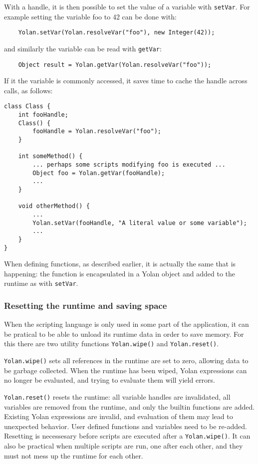 \documentclass[11pt]{report}
\begin{document}
With a handle, it is then possible to set the value of a variable with \verb|setVar|. For example setting the variable foo to 42 can be done with:
\begin{lstlisting}
    Yolan.setVar(Yolan.resolveVar("foo"), new Integer(42));
\end{lstlisting} 
and similarly the variable can be read with \verb|getVar|:
\begin{lstlisting}
    Object result = Yolan.getVar(Yolan.resolveVar("foo"));
\end{lstlisting}

If it the variable is commonly accessed, it saves time to cache the handle across calls, as follows:
\begin{lstlisting}
class Class {
    int fooHandle;
    Class() {
        fooHandle = Yolan.resolveVar("foo");
    }

    int someMethod() {
        ... perhaps some scripts modifying foo is executed ...
        Object foo = Yolan.getVar(fooHandle);
        ...
    }

    void otherMethod() {
        ... 
        Yolan.setVar(fooHandle, "A literal value or some variable");
        ...
    }
}
\end{lstlisting}
When defining functions, as described earlier, it is actually the same that is happening: the function is encapsulated in a Yolan object and added to the runtime as with \verb|setVar|.

\subsubsection{Resetting the runtime and saving space}
When the scripting language is only used in some part of the application, it can be pratical to be able to unload its runtime data in order to save memory. 
For this there are two utility functions \verb|Yolan.wipe()| and \verb|Yolan.reset()|.

\verb|Yolan.wipe()| sets all references in the runtime are set to zero, allowing data to be garbage collected.
When the runtime has been wiped, Yolan expressions can no longer be evaluated, and trying to evaluate them will yield errors. 

\verb|Yolan.reset()| resets the runtime: all variable handles are invalidated, all variables are removed from the runtime, and only the builtin functions are added. Existing Yolan expressions are invalid, and evaluation of them may lead to unexpected behavior. User defined functions and variables need to be re-added.
Resetting is necessesary before scripts are executed after a \verb|Yolan.wipe()|.
It can also be practical when multiple scripts are run, one after each other, and they must not mess up the runtime for each other.
\end{document}
